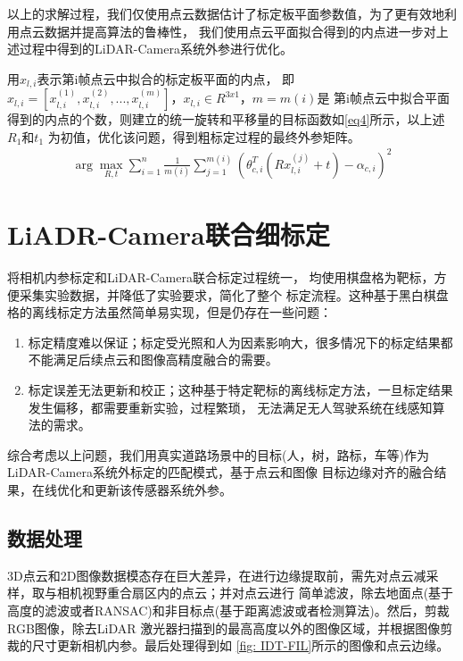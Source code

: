 以上的求解过程，我们仅使用点云数据估计了标定板平面参数值，为了更有效地利用点云数据并提高算法的鲁棒性，
我们使用点云平面拟合得到的内点进一步对上述过程中得到的LiDAR-Camera系统外参进行优化。

用$x_{l,i}$表示第i帧点云中拟合的标定板平面的内点，
即$x_{l,i}=[x_{l,i}^{(1)}, x_{l,i}^{(2)},...,x_{l,i}^{(m)}]$，$x_{l,i} \in R^{3x1}$，$m=m(i)$是
第i帧点云中拟合平面得到的内点的个数，则建立的统一旋转和平移量的目标函数如\eqref{eq4}所示，以上述$R_{1}$和$t_{1}$
为初值，优化该问题，得到粗标定过程的最终外参矩阵。
\begin{equation}\label{eq4}
\begin{aligned}
\arg \max \limits_{R,t} \sum_{i=1}^{n}\frac{1}{m(i)} 
\sum_{j=1}^{m(i)} (\theta_{c,i}^{T} (R x_{l,i}^{(j)}+t)-\alpha_{c,i})^{2}
\end{aligned}
\end{equation}

\section{LiADR-Camera联合细标定}
\label{sec:2}
将相机内参标定和LiDAR-Camera联合标定过程统一， 均使用棋盘格为靶标，方便采集实验数据，并降低了实验要求，简化了整个
标定流程。这种基于黑白棋盘格的离线标定方法虽然简单易实现，但是仍存在一些问题：
\begin{enumerate}[\indent (1)]
\item 标定精度难以保证；标定受光照和人为因素影响大，很多情况下的标定结果都不能满足后续点云和图像高精度融合的需要。
\item 标定误差无法更新和校正；这种基于特定靶标的离线标定方法，一旦标定结果发生偏移，都需要重新实验，过程繁琐，
无法满足无人驾驶系统在线感知算法的需求。
\end{enumerate}

综合考虑以上问题，我们用真实道路场景中的目标(人，树，路标，车等)作为LiDAR-Camera系统外标定的匹配模式，基于点云和图像
目标边缘对齐的融合结果，在线优化和更新该传感器系统外参。


\subsection{数据处理}
3D点云和2D图像数据模态存在巨大差异，在进行边缘提取前，需先对点云减采样，取与相机视野重合扇区内的点云；并对点云进行
简单滤波，除去地面点(基于高度的滤波或者RANSAC)和非目标点(基于距离滤波或者检测算法)。然后，剪裁RGB图像，除去LiDAR
激光器扫描到的最高高度以外的图像区域，并根据图像剪裁的尺寸更新相机内参。最后处理得到如
\figurename\ref{fig: IDT-FIL}所示的图像和点云边缘。

